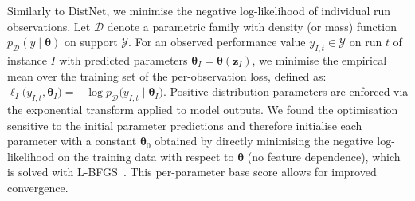 Similarly to DistNet, we minimise the negative log-likelihood of individual run observations.
Let $\mathcal{D}$ denote a parametric family with density (or mass) function $p_{\mathcal{D}}(y\mid \boldsymbol\theta)$ on support $\mathcal{Y}$.
For an observed performance value $y_{I,t}\in\mathcal{Y}$ on run $t$ of instance $I$ with predicted parameters $\boldsymbol\theta_I=\boldsymbol\theta(\mathbf{z}_I)$, we minimise the empirical mean over the training set of the per-observation loss, defined as:
    $\ell_I\bigl(y_{I,t},\boldsymbol\theta_I\bigr) = -\log p_{\mathcal{D}}\bigl(y_{I,t}\mid \boldsymbol\theta_I\bigr)$.
Positive distribution parameters are enforced via the exponential transform applied to model outputs.
We found the optimisation sensitive to the initial parameter predictions and therefore initialise each parameter with a constant $\boldsymbol\theta_0$ obtained by directly minimising the negative log-likelihood on the training data with respect to $\boldsymbol\theta$ (no feature dependence), which is solved with L-BFGS~\citep{LiuEtAl89}.
This per-parameter base score allows for improved convergence.


